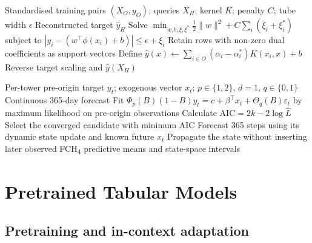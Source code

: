 \begin{algorithm}[H]
\caption{$\epsilon$-support-vector regression gap reconstruction}
\label{alg:app-svr}
\small
\begin{algorithmic}[1]
\Require Standardised training pairs $(X_O,y_O)$; queries $X_H$; kernel $K$;
penalty $C$; tube width $\epsilon$
\Ensure Reconstructed target $\hat y_H$
\State Solve
$\min_{w,b,\xi,\xi^*}\frac12\lVert w\rVert^2+C\sum_i(\xi_i+\xi_i^*)$
subject to $|y_i-(w^\top\phi(x_i)+b)|\le\epsilon+\xi_i$
\State Retain rows with non-zero dual coefficients as support vectors
\State Define
$\hat y(x)\gets\sum_{i\in O}(\alpha_i-\alpha_i^*)K(x_i,x)+b$
\State Reverse target scaling and \Return $\hat y(X_H)$
\end{algorithmic}
\end{algorithm}

\begin{algorithm}[H]
\caption{AIC-selected SARIMAX forecasting}
\label{alg:app-sarimax}
\small
\begin{algorithmic}[1]
\Require Per-tower pre-origin target $y_t$; exogenous vector $x_t$;
$p\in\{1,2\}$, $d=1$, $q\in\{0,1\}$
\Ensure Continuous 365-day forecast
    \State Fit
    $\Phi_p(B)(1-B)y_t=c+\beta^\top x_t+\Theta_q(B)\varepsilon_t$
    by maximum likelihood on pre-origin observations
    \State Calculate $\mathrm{AIC}=2k-2\log\widehat L$
\EndFor
\State Select the converged candidate with minimum AIC
\State Forecast 365 steps using its dynamic state update and known future $x_t$
\State Propagate the state without inserting later observed FCH\textsubscript{4}
\State \Return predictive means and state-space intervals
\end{algorithmic}
\end{algorithm}

\section{Pretrained Tabular Models}

\subsection{Pretraining and in-context adaptation}


